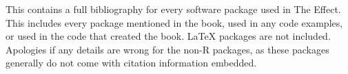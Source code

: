 \documentclass{article}
\begin{document}
	
	This contains a full bibliography for every software package used in The Effect. This includes every package mentioned in the book, used in any code examples, or used in the code that created the book. LaTeX packages are not included. Apologies if any details are wrong for the non-R packages, as these packages generally do not come with citation information embedded.
	
	\nocite{*}
	
	
	
\end{document}
